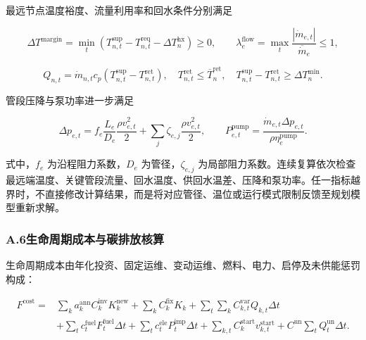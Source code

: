 最远节点温度裕度、流量利用率和回水条件分别满足

\begin{equation}
\Delta T^{\mathrm{margin}}
=\min_t\left(T_{n,t}^{\mathrm{sup}}-T_{n,t}^{\mathrm{req}}-\Delta T_n^{\mathrm{hx}}\right)\geq0,
\qquad
\lambda_e^{\mathrm{flow}}=\max_t\frac{|\dot m_{e,t}|}{\overline{\dot m}_e}\leq1,
\label{eq:network_check}
\end{equation}

\begin{equation}
Q_{n,t}=\dot m_{n,t}c_p(T_{n,t}^{\mathrm{sup}}-T_{n,t}^{\mathrm{ret}}),
\quad
T_{n,t}^{\mathrm{ret}}\leq\overline T_n^{\mathrm{ret}},
\quad
T_{n,t}^{\mathrm{sup}}-T_{n,t}^{\mathrm{ret}}\geq\Delta T_n^{\min}.
\label{eq:return_check}
\end{equation}

管段压降与泵功率进一步满足

\begin{equation}
\Delta p_{e,t}=f_e\frac{L_e}{D_e}\frac{\rho v_{e,t}^{2}}{2}
+\sum_j\zeta_{e,j}\frac{\rho v_{e,t}^{2}}{2},
\qquad
P_{e,t}^{\mathrm{pump}}=\frac{\dot m_{e,t}\Delta p_{e,t}}{\rho\eta_e^{\mathrm{pump}}}.
\label{eq:hydraulic_check}
\end{equation}

式中，$f_e$ 为沿程阻力系数，$D_e$ 为管径，$\zeta_{e,j}$ 为局部阻力系数。连续复算依次检查最远端温度、关键管段流量、回水温度、供回水温差、压降和泵功率。任一指标越界时，不直接修改计算结果，而是将对应管径、温位或运行模式限制反馈至规划模型重新求解。

\subsubsection*{A.6\quad 生命周期成本与碳排放核算}

生命周期成本由年化投资、固定运维、变动运维、燃料、电力、启停及未供能惩罚构成：

\begin{equation}
\begin{aligned}
F^{\mathrm{cost}}={}&
\sum_k a_k^{\mathrm{ann}}C_k^{\mathrm{inv}}K_k^{\mathrm{new}}
+\sum_k C_k^{\mathrm{fix}}K_k
+\sum_t\sum_k C_{k,t}^{\mathrm{var}}Q_{k,t}\Delta t\\
&+\sum_t c_t^{\mathrm{fuel}}F_t^{\mathrm{fuel}}\Delta t
+\sum_t c_t^{\mathrm{ele}}P_t^{\mathrm{imp}}\Delta t
+\sum_{k,t}C_k^{\mathrm{start}}v_{k,t}^{\mathrm{start}}
+C^{\mathrm{un}}\sum_tQ_t^{\mathrm{un}}\Delta t.
\end{aligned}
\label{eq:cost_detail}
\end{equation}

